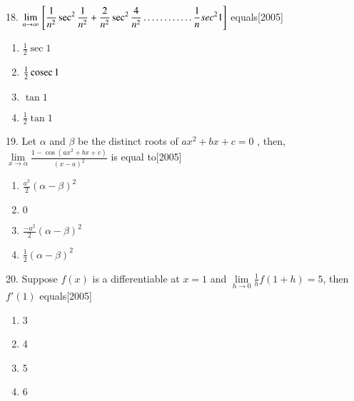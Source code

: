 \documentclass[journal,12pt,twocolumn]{IEEEtran}
\theoremstyle{remark}
\begin{document}
18. $\displaystyle\lim\limits_{n\to\infty}{}\left[\frac{1}{n^2}\sec^2\frac{1}{n^2}+\frac{2}{n^2}\sec^2\frac{4}{n^2}\dots\dots\dots\dots\frac{1}{n}sec^2 1\right]$ equals\hfill[2005]

\begin{enumerate}
    \item $\frac{1}{2}\sec 1$
    \item $\frac{1}{2}\,\text{cosec}\, 1$
    \item $\tan 1$
    \item $\frac{1}{2} \tan 1$\\[2pt]
\end{enumerate}

19. Let $\alpha$ and $\beta$ be the distinct roots of $ax^2+bx+c=0$ , then, $\displaystyle\lim\limits_{x\to\alpha}\frac{1-\cos(ax^2+bx+c)}{(x-a)^2}$ is equal to\hfill[2005]

\begin{enumerate}
    \item $\frac{a^2}{2}(\alpha-\beta)^2$
    \item $0$
    \item $\frac{-a^2}{2}(\alpha-\beta)^2$
    \item $\frac{1}{2}(\alpha-\beta)^2$\\[2pt]
\end{enumerate}

20. Suppose $f(x)$ is a differentiable at $x=1$ and $\lim\limits_{h\to 0}\frac{1}{h}f(1+h)=5$, then $f'(1)$ equals\hfill[2005]

\begin{enumerate}
    \item 3
    \item 4
    \item 5
    \item 6
\end{enumerate}
 
\end{document}
